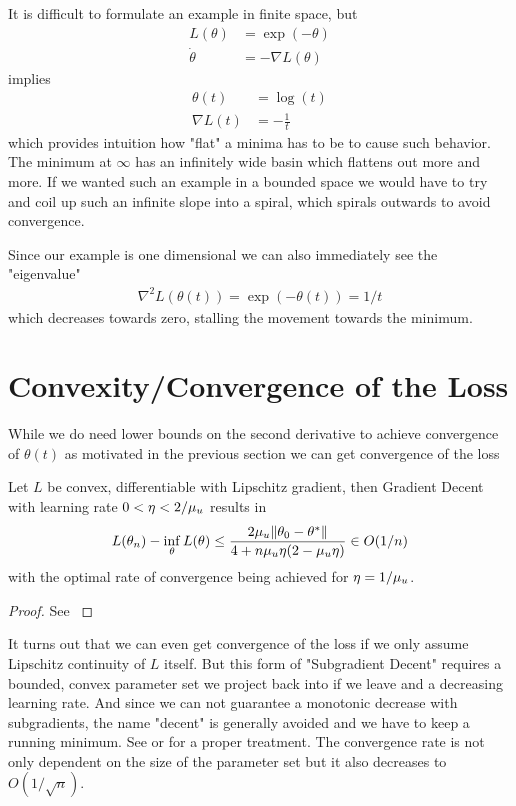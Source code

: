 It is difficult to formulate an example in finite space, but
%
\begin{align*}
	L(\theta) &= \exp(-\theta) \\
	\dot{\theta} &= -\nabla L(\theta)
\end{align*}
%
implies
%
\begin{align*}
	\theta(t) &= \log(t)\\
	\nabla L(t) &= -\tfrac1t
\end{align*}
%
which provides intuition how "flat" a minima has to be to cause such behavior.
The minimum at \(\infty\) has an infinitely wide basin which flattens out
more and more. If we wanted such an example in a bounded space we would have
to try and coil up such an infinite slope into a spiral, which spirals outwards
to avoid convergence.

Since our example is one dimensional we can also immediately see the "eigenvalue"
%
\begin{align*}
	\nabla^2 L(\theta(t)) = \exp(-\theta(t)) = 1/t
\end{align*}
%
which decreases towards zero, stalling the movement towards the minimum.

\section{Convexity/Convergence of the Loss}

While we do need lower bounds on the second derivative to achieve convergence
of \(\theta(t)\) as motivated in the previous section we can get convergence
of the loss

\begin{theorem}
	Let \(L\) be convex, differentiable with Lipschitz gradient, then Gradient
	Decent with learning rate \(0 < \eta < 2/\mu_u\) results in
	\begin{align*}
		L(\theta_n) - \inf_\theta L(\theta)
		\le \frac{2\mu_u\|\theta_0 - \theta^*\|}{4 + n\mu_u\eta(2-\mu_u\eta)}
		\in O(1/n)
	\end{align*}
	with the optimal rate of convergence being achieved for \(\eta=1/\mu_u\).
\end{theorem}
\begin{proof}
	See \textcite[Theorem 2.1.14, Corollary
	2.1.2]{nesterovLecturesConvexOptimization2018}
 \end{proof}

It turns out that we can even get convergence of the loss if we only assume
Lipschitz continuity of \(L\) itself. But this form of "Subgradient Decent"
requires a bounded, convex parameter set we project back into if we leave and
a decreasing learning rate. And since we can not guarantee a monotonic decrease
with subgradients, the name "decent" is generally avoided and we have to keep
a running minimum. See \textcite[Section 3.2.3]{nesterovLecturesConvexOptimization2018}
or \textcite[Section 3.1]{bubeckConvexOptimizationAlgorithms2015} for a proper
treatment. The convergence rate is not only dependent on the size of the
parameter set but it also decreases to \(O(1/\sqrt{n})\).

